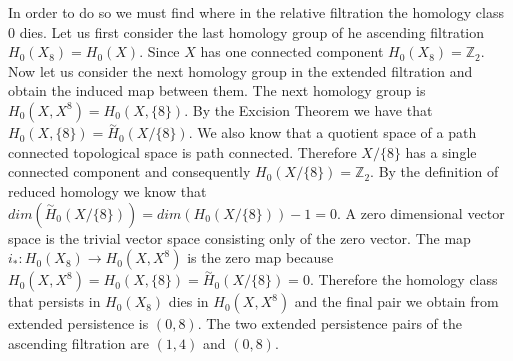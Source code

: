 In order to do so we must find where in the relative filtration the homology class $0$ dies. Let us first consider the last homology group of he ascending filtration $H_0(X_8) = H_0(X)$. Since $X$ has one connected component $H_0(X_8) = \mathbb{Z}_2$. Now let us consider the next homology group in the extended filtration and obtain the induced map between them. The next homology group is $H_0(X, X^8) = H_0(X, \{8\})$. By the Excision Theorem we have that $H_0(X, \{8\}) = \overset{\sim}{H}_0(X / \{8\})$. We also know that a quotient space of a path connected topological space is path connected. Therefore $X / \{8\}$ has a single connected component and consequently $H_0(X / \{8\}) =\mathbb{Z}_2$.
By the definition of reduced homology we know that $dim(\overset{\sim}{H}_0(X / \{8\})) = dim(H_0(X / \{8\})) - 1 = 0$.
A zero dimensional vector space is the trivial vector space consisting only of the zero vector. The map $i_* : H_0(X_8) \to H_0(X, X^8)$ is the zero map because $H_0(X, X^8) = H_0(X, \{8\}) = \overset{\sim}{H}_0(X / \{8\}) = 0$. Therefore the homology class that persists in $H_0(X_8)$ dies in $H_0(X, X^8)$ and the final pair we obtain from extended persistence is $(0, 8)$. The two extended persistence pairs of the ascending filtration are $(1, 4)$ and $(0, 8)$.


